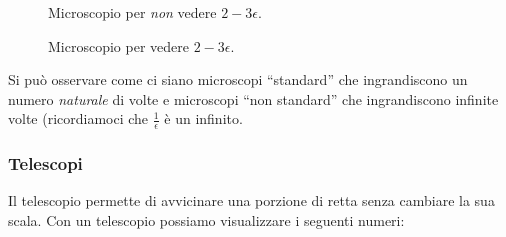 \begin{figure}[h]
\begin{inaccessibleblock}

\begin{minipage}{.48\linewidth}
 \begin{center}
\scalebox{0.8}{\microscopioc}
 \end{center}
\caption{Microscopio per \emph{non} vedere \(2-3\epsilon\).} 
\label{fig:microscopioc}
\end{minipage}
\hfill
\begin{minipage}{.48\linewidth}
 \begin{center}
\scalebox{0.8}{\microscopiod}
 \end{center}
\caption{Microscopio per vedere \(2-3\epsilon\).} \label{fig:microscopiod}
\end{minipage}

\end{inaccessibleblock}
\end{figure}
 
Si può osservare come ci siano microscopi ``standard'' che ingrandiscono un 
numero \emph{naturale} di volte e microscopi ``non standard'' che 
ingrandiscono infinite volte (ricordiamoci che \(\frac{1}{\epsilon}\) è un 
infinito.

\newpage %

\subsubsection{Telescopi}
\label{subsec:insnum_telescopi}

Il telescopio permette di avvicinare una porzione di retta senza cambiare 
la 
sua scala. 
Con un telescopio possiamo visualizzare i seguenti numeri:

